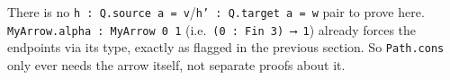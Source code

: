 There is no \texttt{h : Q.source a = v}/\texttt{h' : Q.target a = w} pair to prove here. \texttt{MyArrow.alpha : MyArrow 0 1} (i.e.~\texttt{(0 : Fin 3) ⟶ 1}) already forces the endpoints via its type, exactly as flagged in the previous section. So \texttt{Path.cons} only ever needs the arrow itself, not separate proofs about it.
